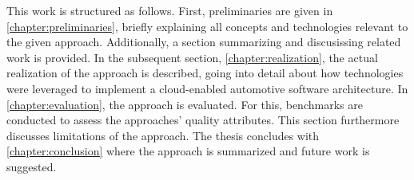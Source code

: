 This work is structured as follows. First, preliminaries are given in \cref{chapter:preliminaries}, briefly explaining all concepts and technologies relevant to the given approach. Additionally, a section summarizing and discusissing related work is provided. In the subsequent section, \cref{chapter:realization}, the actual realization of the approach is described, going into detail about how technologies were leveraged to implement a cloud-enabled automotive software architecture. In \cref{chapter:evaluation}, the approach is evaluated. For this, benchmarks are conducted to assess the approaches' quality attributes. This section furthermore discusses limitations of the approach. The thesis concludes with \cref{chapter:conclusion} where the approach is summarized and future work is suggested.

%
%
%
%
%
%
%
%
%
%
%
%
%
%
%
%
%
%
%
%
%
%
%
%
%
%
%
%
%
%
%
%
%
%
%
%
%
%
